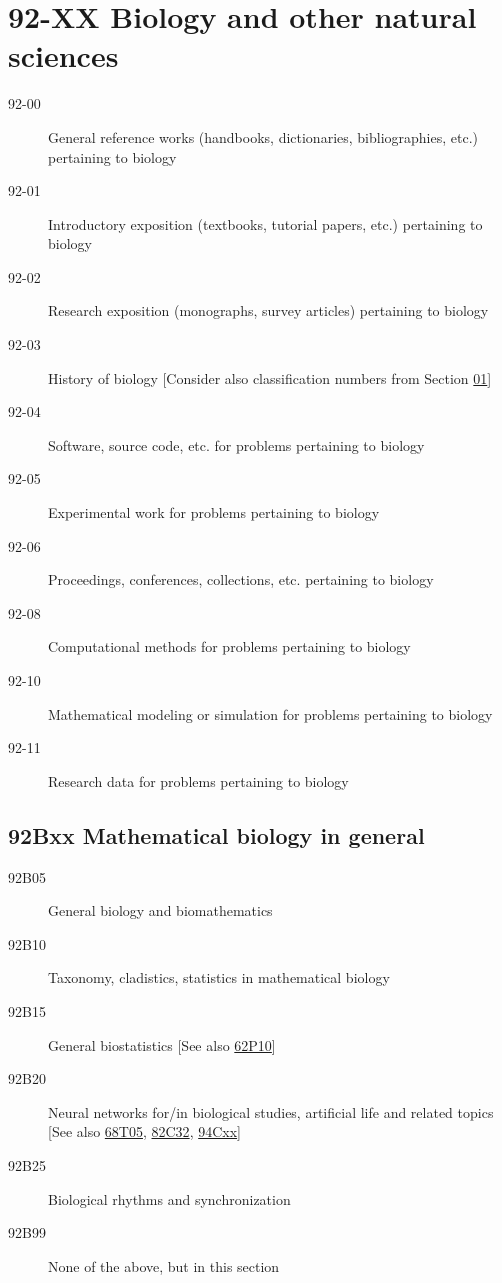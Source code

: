 \documentclass[letterpaper]{article}
\begin{document}
\section*{92-XX Biology and other natural sciences }\label{92-XX}
\begin{description}
\item [92-00]\label{92-00} General reference works (handbooks, dictionaries, bibliographies, etc.) pertaining to biology
\item [92-01]\label{92-01} Introductory exposition (textbooks, tutorial papers, etc.) pertaining to biology
\item [92-02]\label{92-02} Research exposition (monographs, survey articles) pertaining to biology
\item [92-03]\label{92-03} History of biology [Consider also classification numbers from Section \hyperref[01-XX]{01}]
\item [92-04]\label{92-04} Software, source code, etc. for problems pertaining to biology
\item [92-05]\label{92-05} Experimental work for problems pertaining to biology
\item [92-06]\label{92-06} Proceedings, conferences, collections, etc. pertaining to biology
\item [92-08]\label{92-08} Computational methods for problems pertaining to biology
\item [92-10]\label{92-10} Mathematical modeling or simulation for problems pertaining to biology
\item [92-11]\label{92-11} Research data for problems pertaining to biology
\end{description}
\subsection*{92Bxx  Mathematical biology in general }\label{92Bxx}
\begin{description}  
\item [92B05]\label{92B05} General biology and biomathematics
\item [92B10]\label{92B10} Taxonomy, cladistics, statistics in mathematical biology
\item [92B15]\label{92B15} General biostatistics [See also \hyperref[62P10]{62P10}]
\item [92B20]\label{92B20} Neural networks for/in biological studies, artificial life and related topics [See also \hyperref[68T05]{68T05}, \hyperref[82C32]{82C32}, \hyperref[94Cxx]{94Cxx}]
\item [92B25]\label{92B25} Biological rhythms and synchronization
\item [92B99]\label{92B99} None of the above, but in this section
\end{description}
\end{document}
